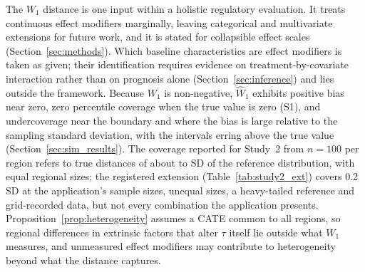 \documentclass[AMA,Times1COL]{WileyNJDv5}
\begin{document}
The $W_1$ distance is one input within a holistic regulatory evaluation.\cite{iche17,matsushima2024} It treats continuous effect modifiers marginally, leaving categorical and multivariate extensions for future work, and it is stated for collapsible effect scales (Section~\ref{sec:methods}). Which baseline characteristics are effect modifiers is taken as given; their identification requires evidence on treatment-by-covariate interaction rather than on prognosis alone (Section~\ref{sec:inference}) and lies outside the framework.
Because $W_1$ is non-negative, $\widehat{W}_1$ exhibits positive bias near zero, zero percentile coverage when the true value is zero (S1), and undercoverage near the boundary and where the bias is large relative to the sampling standard deviation, with the intervals erring above the true value (Section~\ref{sec:sim_results}).\cite{andrews2000} The coverage reported for Study~2 from $n = 100$ per region refers to true distances of about  to  SD of the reference distribution, with equal regional sizes; the registered extension (Table~\ref{tab:study2_ext}) covers 0.2 SD at the application's sample sizes, unequal sizes, a heavy-tailed reference and grid-recorded data, but not every combination the application presents. Proposition~\ref{prop:heterogeneity} assumes a CATE common to all regions, so regional differences in extrinsic factors that alter $\tau$ itself lie outside what $W_1$ measures, and unmeasured effect modifiers may contribute to heterogeneity beyond what the distance captures.
\end{document}
